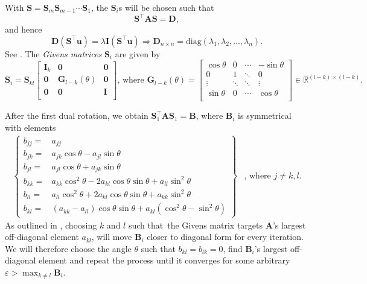 \documentclass[]{article}
\begin{document}
With $\mathbf{S} = \mathbf{S}_m \mathbf{S}_{m-1} \cdots \mathbf{S}_1$, the $\mathbf{S}_i$s will be chosen such that
\[
\mathbf{S}^\intercal \mathbf{A} \mathbf{S} = \mathbf{D}, 
\]
and hence
\[
\mathbf{D} (\mathbf{S}^\intercal \mathbf{u})= \lambda \mathbf{I} (\mathbf{S}^\intercal \mathbf{u}) \Rightarrow \mathbf{D}_{n \times n} = \mathrm{diag}(\lambda_1, \lambda_2, \ldots, \lambda_n).
\]
See \cite{fys4150-notes}. The \textit{Givens matrices} \cite{mat-inf4130} $\mathbf{S}_i$ are given by
\begin{equation*}
\mathbf{S}_i = \mathbf{S}_{kl}
\begin{bmatrix}
\mathbf{I}_k & \mathbf{0} & \mathbf{0} \\
\mathbf{0} & \mathbf{G}_{l-k}(\theta) & \mathbf{0} \\
\mathbf{0} & \mathbf{0} & \mathbf{I} \\
\end{bmatrix}
\text{, where }
\mathbf{G}_{l-k}(\theta) = 
\begin{bmatrix}
\cos \theta 	& 0 		& \cdots 		& -\sin \theta \\
0 				& 1 		& \ddots 		& 0 \\
\vdots 			& \ddots	& \ddots 		& \vdots \\
\sin \theta 	& 0 		& \cdots 		& \cos \theta \\
\end{bmatrix} \in \mathbb{R}^{(l-k) \times (l-k)}.
\end{equation*}

After the first dual rotation, we obtain $\mathbf{S}_1^\intercal \mathbf{A} \mathbf{S}_1 = \mathbf{B}$, where $\mathbf{B}_i$ is symmetrical with elements
\begin{equation}
\label{b_elements}
\begin{array}{cc}
\left\{
\begin{aligned}
b_{jj} =& a_{jj} \\
b_{jk} =& a_{jk}\cos\theta - a_{jl}\sin\theta \\
b_{jl} =& a_{jl}\cos\theta + a_{jk}\sin\theta \\
b_{kk} =& a_{kk}\cos^2\theta - 2a_{kl}\cos\theta \sin\theta +a_{ll}\sin^2\theta\nonumber\\
b_{ll} =& a_{ll}\cos^2\theta +2a_{kl}\cos\theta \sin\theta +a_{kk}\sin^2\theta\nonumber\\
b_{kl} =& (a_{kk}-a_{ll})\cos\theta \sin\theta +a_{kl}(\cos^2\theta-\sin^2\theta)\nonumber 
\end{aligned}
\right\} &
\text{, where } j \ne k,l.
\end{array}
\end{equation}
As outlined in \cite{fys4150-notes}, choosing $k$ and $l$ such that the Givens matrix targets $\mathbf{A}$'s largest off-diagonal element $a_{kl}$, will move $\mathbf{B}_i$ closer to diagonal form for every iteration. We will therefore choose the angle $\theta$ such that $b_{kl} = b_{lk} = 0$, find $\mathbf{B}_i$'s largest off-diagonal element and repeat the process until it converges for some arbitrary $\varepsilon > \max_{k \neq l} \mathbf{B}_i$.
\end{document}
